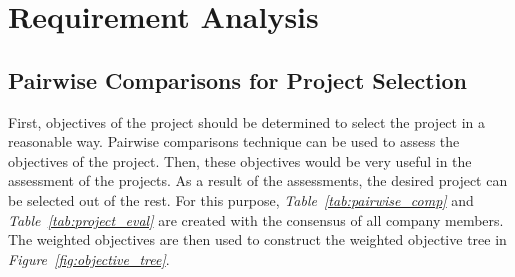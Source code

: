 \documentclass[a4paper,12pt]{article}
\begin{document}
\newpage

\section{Requirement Analysis}
	
	\subsection{Pairwise Comparisons for Project Selection}
		First, objectives of the project should be determined to select the project in a reasonable way. Pairwise comparisons technique can be used to assess the objectives of the project. Then, these objectives would be very useful in the assessment of the projects. As a result of the assessments, the desired project can be selected out of the rest. For this purpose, \textit{Table~\ref{tab:pairwise_comp}} and \textit{Table~\ref{tab:project_eval}} are created with the consensus of all company members. The weighted objectives are then used to construct the weighted objective tree in \textit{Figure~\ref{fig:objective_tree}}. 
		
\end{document}
